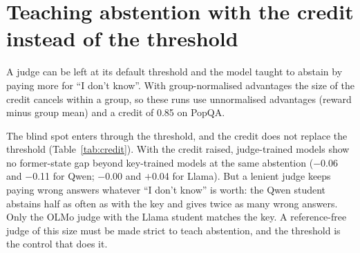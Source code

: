 \documentclass[11pt,a4paper,twocolumn]{article}
\newcommand{\idk}{``I don't know''}
\begin{document}
\section{Teaching abstention with the credit instead of the threshold}
\label{app:credit}

A judge can be left at its default threshold and the model taught to abstain by paying more for \idk{}. With group-normalised advantages the size of the credit cancels within a group, so these runs use unnormalised advantages (reward minus group mean) and a credit of 0.85 on PopQA.

\begin{table}[H]
\small
\centering
\setlength{\tabcolsep}{3.5pt}
\caption{Abstention taught by a higher credit with judges at their default threshold, against the strict cut. Shares of PopQA held-out questions that are refused, answered wrongly and answered rightly, and the share of known former-state capitals refused. One or two runs per credit row. Right and wrong are by the answer key alone.}
\label{tab:credit}
\end{table}

The blind spot enters through the threshold, and the credit does not replace the threshold (Table~\ref{tab:credit}). With the credit raised, judge-trained models show no former-state gap beyond key-trained models at the same abstention ($-$0.06 and $-$0.11 for Qwen; $-$0.00 and $+$0.04 for Llama). But a lenient judge keeps paying wrong answers whatever \idk{} is worth: the Qwen student abstains half as often as with the key and gives twice as many wrong answers. Only the OLMo judge with the Llama student matches the key. A reference-free judge of this size must be made strict to teach abstention, and the threshold is the control that does it.
\end{document}

